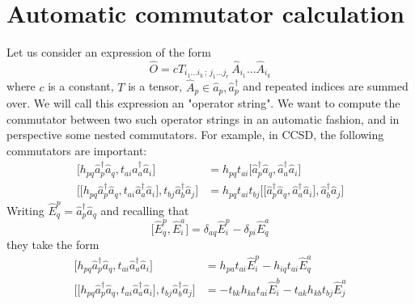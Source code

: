 \documentclass{report}
\begin{document}
\section{Automatic commutator calculation}

Let us consider an expression of the form
\begin{equation}
\hat{O} = c T_{i_1 \dots i_k \, ; \, j_1 \dots j_r} \, \hat{A}_{i_1} \dots \hat{A}_{i_k}
\end{equation}
where $c$ is a constant, $T$ is a tensor, $\hat{A}_p \in \hat{a}_p, \hat{a}^\dagger_p$ and repeated indices are summed over. 
We will call this expression an "operator string". We want to compute the commutator between two such operator strings in an
automatic fashion, and in perspective some nested commutators. For example, in CCSD, the following commutators are important:
\begin{equation}
\begin{split}
\Big[ h_{pq} \hat{a}^\dagger_p \hat{a}_q , t_{ai} \hat{a}^\dagger_a \hat{a}_i  \Big] 
&= 
h_{pq} t_{ai} 
\Big[ \hat{a}^\dagger_p \hat{a}_q , \hat{a}^\dagger_a \hat{a}_i  \Big]
\\
\Big[ \Big[ h_{pq} \hat{a}^\dagger_p \hat{a}_q , t_{ai} \hat{a}^\dagger_a \hat{a}_i  \Big] , t_{bj} \hat{a}^\dagger_b \hat{a}_j \Big] 
&= 
h_{pq}  t_{ai} t_{bj} 
\Big[ \Big[ \hat{a}^\dagger_p \hat{a}_q , \hat{a}^\dagger_a \hat{a}_i  \Big] , \hat{a}^\dagger_b \hat{a}_j \Big] 
\end{split}
\end{equation}
Writing $\hat{E}^p_q = \hat{a}^\dagger_p \hat{a}_q$ and recalling that
\begin{equation}
\Big[ \hat{E}^p_q , \hat{E}^a_i \Big] = \delta_{aq} \hat{E}^p_i - \delta_{pi} \hat{E}^a_q
\end{equation}
they take the form
\begin{equation}
\begin{split}
\Big[ h_{pq} \hat{a}^\dagger_p \hat{a}_q , t_{ai} \hat{a}^\dagger_a \hat{a}_i  \Big] 
&= 
h_{pa} t_{ai} \hat{E}^p_i - h_{iq} t_{ai} \hat{E}^a_q
\\
\Big[ \Big[ h_{pq} \hat{a}^\dagger_p \hat{a}_q , t_{ai} \hat{a}^\dagger_a \hat{a}_i  \Big] , t_{bj} \hat{a}^\dagger_b \hat{a}_j \Big] 
&= 
- t_{bk} h_{ka} t_{ai} \hat{E}^b_i
- t_{ak} h_{kb} t_{bj} \hat{E}^a_j
\end{split}
\end{equation}
\end{document}
